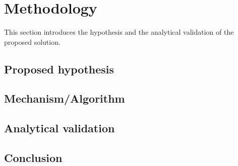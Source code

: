 \chapter{Methodology}
This section introduces the hypothesis and the analytical validation of the proposed solution. 
\section{Proposed hypothesis}
\section{Mechanism/Algorithm}
\section{Analytical validation}
\section{Conclusion}